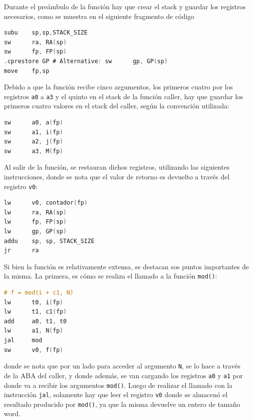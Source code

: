 \documentclass[a4paper,12pt]{article}
\numberwithin{equation}{section}
\numberwithin{figure}{section}
\begin{document}
Durante el preámbulo de la función hay que crear el stack y guardar los registros necesarios, como se muestra en el siguiente fragmento de código
\begin{lstlisting}[language=C, style=StyleC]
subu    sp,sp,STACK_SIZE
sw      ra, RA(sp)
sw	    fp, FP(sp)
.cprestore GP # Alternative: sw      gp, GP(sp)
move    fp,sp
\end{lstlisting}

Debido a que la función recibe cinco argumentos, los primeros cuatro por los registros \texttt{a0} a \texttt{a3} y el quinto en el stack de la función caller, hay que guardar los primeros cuatro valores en el stack del caller, según la convención utilizada:
\begin{lstlisting}[language=C, style=StyleC]
sw      a0, a(fp)
sw      a1, i(fp)
sw      a2, j(fp)
sw      a3, M(fp)
\end{lstlisting}

Al salir de la función, se restauran dichos registros, utilizando las siguientes instrucciones, donde se nota que el valor de retorno es devuelto a través del registro \texttt{v0}:
\begin{lstlisting}[language=C, style=StyleC]
lw		v0, contador(fp)
lw      ra, RA(sp)
lw      fp, FP(sp)
lw      gp, GP(sp)
addu    sp, sp, STACK_SIZE
jr		ra
\end{lstlisting}

Si bien la función es relativamente extensa, se destacan sos puntos importantes de la misma. La primera, es cómo se realiza el llamado a la función \texttt{mod()}:
\begin{lstlisting}[language=C, style=StyleC]
# f = mod(i + c1, N)
lw		t0, i(fp)
lw		t1, c1(fp)
add     a0, t1, t0
lw		a1, N(fp)
jal		mod
sw		v0, f(fp)
\end{lstlisting}
donde se nota que por un lado para acceder al argumento \texttt{N}, se lo hace a través de la ABA del caller, y donde además, se van cargando los registros \texttt{a0} y \texttt{a1} por donde va a recibir los argumentos \texttt{mod()}. Luego de realizar el llamado con la instrucción \texttt{jal}, solamente hay que leer el registro \texttt{v0} donde se almacenó el resultado producido por \texttt{mod()}, ya que la misma devuelve un entero de tamaño word.
\end{document}
